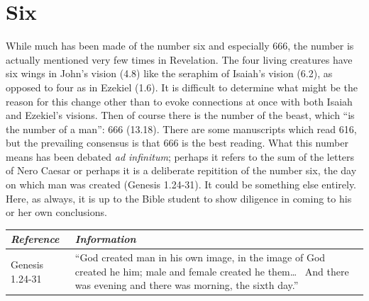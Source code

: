 \section*{Six}
While much has been made of the number six and especially 666, the number is actually mentioned very few times in Revelation. The four living creatures have six wings in John's vision (4.8) like the seraphim of Isaiah's vision (6.2), as opposed to four as in Ezekiel (1.6). It is difficult to determine what might be the reason for this change other than to evoke connections at once with both Isaiah and Ezekiel's visions.
\newline\newline
Then of course there is the number of the beast, which ``is the number of a man'': 666 (13.18). There are some manuscripts which read 616, but the prevailing consensus is that 666 is the best reading. What this number means has been debated \textit{ad infinitum}; perhaps it refers to the sum of the letters of Nero Caesar or perhaps it is a deliberate repitition of the number six, the day on which man was created (Genesis 1.24-31). It could be something else entirely. Here, as always, it is up to the Bible student to show diligence in coming to his or her own conclusions.
\newline\newline
\begin{tabularx}{\textwidth}{l X}
\toprule
\rowcolor{headergray}\emph{Reference} & \emph{Information}\\ 
\midrule
Genesis 1.24-31 & ``God created man in his own image, in the image of God created he him; male and female created he them\ldots~ And there was evening and there was morning, the sixth day.'' \\
\bottomrule
\end{tabularx}

